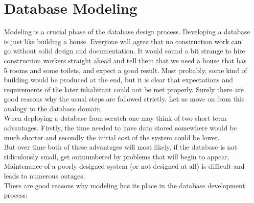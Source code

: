 \section{Database Modeling}
\label{chap:database_modeling}

Modeling is a crucial phase of the database design process.
Developing a database is just like building a house. 
Everyone will agree that no construction work can go without solid design and documentation. 
It would sound a bit strange to hire construction workers straight ahead and tell them that we need a house that has 5 rooms and some toilets, and expect a good result. Most probably, some kind of building would be produced at the end, but it is clear that expectations and requirements of the later inhabitant could not be met properly.
Surely there are good reasons why the usual steps are followed strictly.
Let us move on from this analogy to the database domain. \\
When deploying a database from scratch one may think of two short term advantages. Firstly, the time needed to have data stored somewhere would be much shorter and secondly the initial cost of the system could be lower. \\
But over time both of these advantages will most likely, if the database is not ridiculously small, get outnumbered by problems that will begin to appear. Maintenance of a poorly designed system (or not designed at all) is difficult and leads to numerous outages.\\

There are good reasons why modeling has its place in the database development process:

